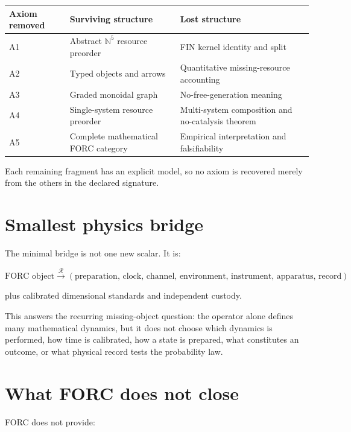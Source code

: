 \documentclass[11pt,a4paper,openany]{report}
\begin{document}
\begin{center}
\begingroup\small
\setlength{\tabcolsep}{2.5pt}
\renewcommand{\arraystretch}{1.16}
\begin{longtable}{@{}p{}p{}p{}@{}}
\toprule
\textbf{Axiom removed} & \textbf{Surviving structure} & \textbf{Lost structure} \\
\midrule
\endhead
A1 & Abstract \(\mathbb N^5\) resource preorder & FIN kernel identity and split \\
A2 & Typed objects and arrows & Quantitative missing-resource accounting \\
A3 & Graded monoidal graph & No-free-generation meaning \\
A4 & Single-system resource preorder & Multi-system composition and no-catalysis theorem \\
A5 & Complete mathematical FORC category & Empirical interpretation and falsifiability \\
\bottomrule
\end{longtable}
\endgroup
\end{center}

Each remaining fragment has an explicit model, so no axiom is recovered merely from the others in the declared signature.

\section{Smallest physics bridge}

The minimal bridge is not one new scalar. It is:

\[
\boxed{
\text{FORC object}
\xrightarrow{\ \mathcal R\ }
(\text{preparation, clock, channel, environment,
instrument, apparatus, record})
}
\]

plus calibrated dimensional standards and independent custody.

This answers the recurring missing-object question: the operator alone defines many mathematical dynamics, but it does not choose which dynamics is performed, how time is calibrated, how a state is prepared, what constitutes an outcome, or what physical record tests the probability law.

\section{What FORC does not close}

FORC does not provide:
\end{document}
